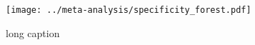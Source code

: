 \begin{figure}[p]


\texttt{[image: ../meta-analysis/specificity\_forest.pdf]}

\caption[short caption]{long caption}
\end{figure}
